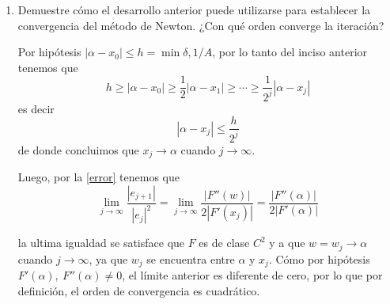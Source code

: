 \begin{problema}
\begin{enumerate}[label=\alph*)]
    \item Demuestre cómo el desarrollo anterior puede utilizarse para establecer la convergencia del método de Newton. ¿Con qué orden converge la iteración?
    
    Por hipótesis \(|\alpha-x_0|\le h=\min{\delta, 1/A}\), por lo tanto del inciso anterior tenemos que
    \[h\ge|\alpha-x_0|\ge\frac{1}{2}|\alpha-x_1|\ge\cdots\ge\frac{1}{2^j}|\alpha-x_j|\]
    es decir\[|\alpha-x_j|\le\frac{h}{2^j}\]
    de donde concluimos que \(x_j\to\alpha\) cuando \(j\to\infty\).
    
    Luego, por la \cref{error} tenemos que
    \[\lim_{j\to\infty}\frac{|e_{j+1}|}{|e_j|^2}=\lim_{j\to\infty}\frac{|F''(w)|}{2|F'(x_j)|}=\frac{|F''(\alpha)|}{2|F'(\alpha)|}\]

    la ultima igualdad se satisface que \(F\) es de clase \(C^2\) y a que \(w=w_j\to\alpha\) cuando \(j\to\infty\), ya que \(w_j\) se encuentra entre \(\alpha\) y \(x_j\). Cómo por hipótesis \(F'(\alpha),\ F''(\alpha)\not=0\), el límite anterior es diferente de cero,  por lo que por definición, el orden de convergencia es cuadrático.
\end{enumerate}
\end{problema}


